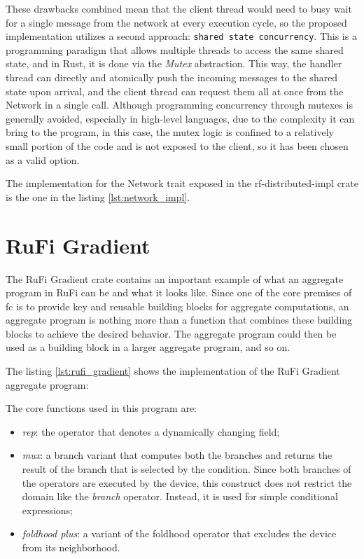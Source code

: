 These drawbacks combined mean that the client thread would need to busy wait for a single message from the network at every execution cycle, so the proposed implementation
utilizes a second approach: \texttt{shared state concurrency}. This is a programming paradigm that allows multiple threads to access the same shared state, and in Rust, it is done
via the \textit{Mutex} abstraction. This way, the handler thread can directly and atomically push the incoming messages to the shared state upon arrival, and the client thread can request
them all at once from the Network in a single call. Although programming concurrency through mutexes is generally avoided, especially in high-level languages, due to the complexity it can bring
to the program, in this case, the mutex logic is confined to a relatively small portion of the code and is not exposed to the client, so it has been chosen as a valid option.

The implementation for the Network trait exposed in the rf-distributed-impl crate is the one in the listing \ref{lst:network_impl}.



\section{RuFi Gradient}
The RuFi Gradient crate contains an important example of what an aggregate program in RuFi can be and what it looks like. Since one of the core premises of \ac{fc} is to
provide key and reusable building blocks for aggregate computations, an aggregate program is nothing more than a function that combines these building blocks to achieve the
desired behavior. The aggregate program could then be used as a building block in a larger aggregate program, and so on.

The listing \ref{lst:rufi_gradient} shows the implementation of the RuFi Gradient aggregate program:



The core functions used in this program are:

\begin{itemize}
    \item \textit{rep}: the operator that denotes a dynamically changing field;
    \item \textit{mux}: a branch variant that computes both the branches and returns the result of the branch that is selected by the condition. Since both branches of the operators
          are executed by the device, this construct does not restrict the domain like the \textit{branch} operator. Instead, it is used for simple conditional expressions;
    \item \textit{foldhood plus}: a variant of the foldhood operator that excludes the device from its neighborhood.
\end{itemize}

